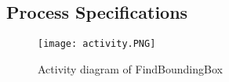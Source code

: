 \subsection{Process Specifications}
\begin{figure}[h!]
  \caption{Activity diagram of FindBoundingBox}
  \centering
	\texttt{[image: activity.PNG]}
\end{figure}
